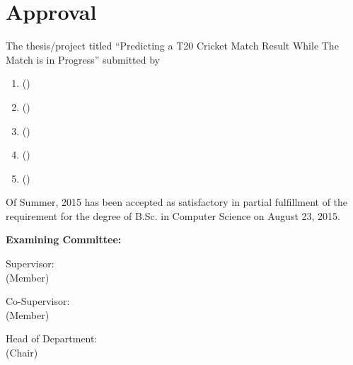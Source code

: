 \section*{Approval}

The thesis/project titled “Predicting a T20 Cricket Match Result While The Match is in Progress” submitted by 
\begin{enumerate}
\color{\studentonecolor}
  \item \studentonename (\studentoneid)
  \color{\studenttwocolor}
  \item \studenttwoname (\studenttwoid)
  \color{\studentthreecolor}
  \item \studentthreename (\studentthreeid)
  \color{\studentfourcolor}
  \item \studentfourname (\studentfourid)
  \color{\studentfivecolor}
   \item \studentfivename (\studentfiveid)
   \color{black}
\end{enumerate}

Of Summer, 2015 has been accepted as satisfactory in partial fulfillment of the requirement for the degree of B.Sc. in Computer Science on August 23, 2015. 

\vspace{0.5cm}
\textbf{Examining Committee:}

\vspace{1cm}

Supervisor:\\
(Member)
\begin{center}
    \hspace{7cm}  \hspace{1cm} 
\end{center}

Co-Supervisor:\\
(Member)
\begin{center}
    \hspace{7cm}  \hspace{1cm} 
\end{center}

Head of Department:\\
(Chair)
\begin{center}
    \hspace{7cm}  \hspace{1cm} 
\end{center}

\pagebreak